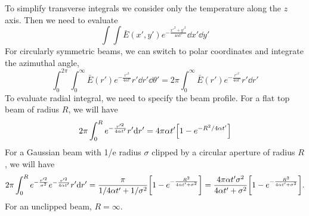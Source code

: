 \documentclass[]{article}
\begin{document}
To simplify transverse integrals we consider only the temperature along the $z$ axis. Then
we need to evaluate
\begin{equation*}
    \int \int \bar{E}(x',y') e^{-\frac{x'^2 + y'^2}{4\alpha t'}} \dd x' \dd y'
\end{equation*}
For circularly symmetric beams, we can switch to polar coordinates and
integrate the azimuthal angle,
\begin{equation*}
    \int_0^{2\pi} \int_0^\infty \bar{E}(r') e^{-\frac{r'^2}{4\alpha t'}} r'\dd r' \dd \theta'
    = 2\pi \int_0^\infty  \bar{E}(r') e^{-\frac{r'^2}{4\alpha t'}} r'\dd r'
\end{equation*}
To evaluate radial integral, we need to specify the beam profile. For a flat top
beam of radius $R$, we will have
\begin{equation*}
  2\pi \int_0^R e^{-\frac{r'^2}{4\alpha t'}} r'\dd r'
  =  4\pi \alpha t' \qty[1 - e^{-R^2/4\alpha t'}]
\end{equation*}
For a Gaussian beam with 1/e radius $\sigma$ clipped by a circular aperture of radius $R$, we will have
\begin{equation*}
2\pi \int_0^R e^{-\frac{r'^2}{\sigma^2}} e^{-\frac{r'^2}{4\alpha t'}} r'\dd r'
=  \frac{\pi}{1/4\alpha t' + 1/\sigma^2} \qty[1 - e^{-\frac{R^2}{4\alpha t' + \sigma^2}}]
=  \frac{4 \pi \alpha t' \sigma^2}{4\alpha t' + \sigma^2} \qty[1 - e^{-\frac{R^2}{4\alpha t' + \sigma^2}}]
.
\end{equation*}
For an unclipped beam, $R = \infty$.
\end{document}
